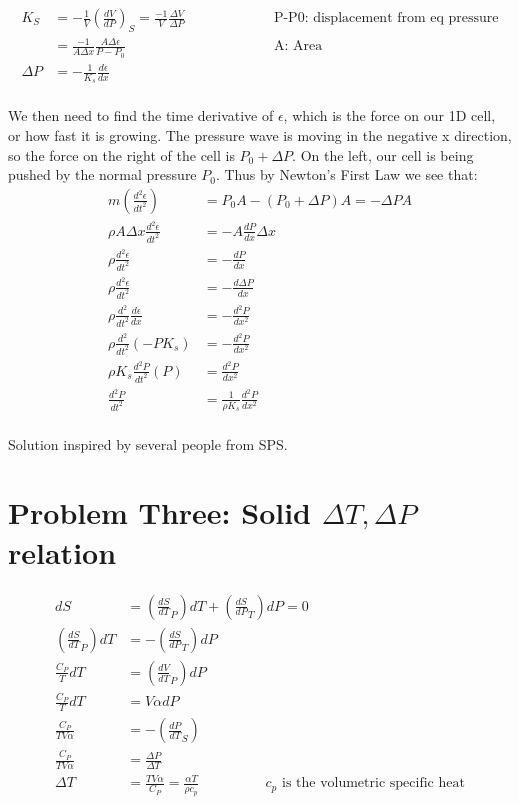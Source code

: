 \documentclass[10pt]{article} %
\begin{document}
\begin{align*}
  K_S &= -\frac{1}{V}\left(\frac{dV}{dP}\right)_S
  = \frac{-1}{V}\frac{\Delta V}{\Delta P}& \hspace{2cm}&\mbox{P-P0: displacement from eq pressure}\\
  &= \frac{-1}{A\Delta x}\frac{A\Delta\epsilon}{P-P_0}& \hspace{2cm}&\mbox{A: Area}\\
  \Delta P &= -\frac{1}{K_s}\frac{d\epsilon}{dx}\\
\end{align*}

We then need to find the time derivative of $\epsilon$, which is the force on our
1D cell, or how fast it is growing. The pressure wave is moving in the negative
x direction, so the force on the right of the cell is $P_0 + \Delta P$. On the
left, our cell is being pushed by the normal pressure $P_0$. Thus by Newton's First
Law we see that:\\

\begin{align*}
  m\left(\frac{d^2\epsilon}{dt^2}\right) &= P_0A - (P_0+\Delta P)A = -\Delta PA\\
  \rho A \Delta x \frac{d^2\epsilon}{dt^2} &= -A\frac{dP}{dx}\Delta x\\
  \rho \frac{d^2\epsilon}{dt^2} &= -\frac{dP}{dx}\\
  \rho \frac{d^2\epsilon}{dt^2} &= -\frac{d \Delta P}{dx}\\
  \rho \frac{d^2}{dt^2}\frac{d\epsilon}{dx} &= -\frac{d^2P}{dx^2}\\
  \rho \frac{d^2}{dt^2}\left(-PK_s\right) &= -\frac{d^2P}{dx^2}\\
  \rho K_s \frac{d^2P}{dt^2}\left(P\right) &= \frac{d^2P}{dx^2}\\
  \frac{d^2P}{dt^2} &= \frac{1}{\rho K_s }\frac{d^2P}{dx^2}\\
\end{align*}

Solution inspired by several people from SPS.\\

\section{Problem Three: Solid $\Delta T, \Delta P$ relation}

\begin{align*}
  dS &= \left(\frac{dS}{dT}_P\right)dT + \left(\frac{dS}{dP}_T\right)dP = 0\\
  \left(\frac{dS}{dT}_P\right)dT &= -\left(\frac{dS}{dP}_T\right)dP\\
  \frac{C_P}{T}dT &= \left(\frac{dV}{dT}_P\right)dP\\
  \frac{C_P}{T}dT &= V\alpha dP\\
  \frac{C_P}{TV\alpha} &= -\left(\frac{dP}{dT}_S\right)\\
  \frac{C_P}{TV\alpha} &= \frac{\Delta P}{\Delta T}\\
  \Delta T &= \frac{TV\alpha}{C_P} = \frac{\alpha T}{\rho c_p} \hspace{2cm}
  c_p \mbox{ is the volumetric specific heat}
\end{align*}
\end{document}
